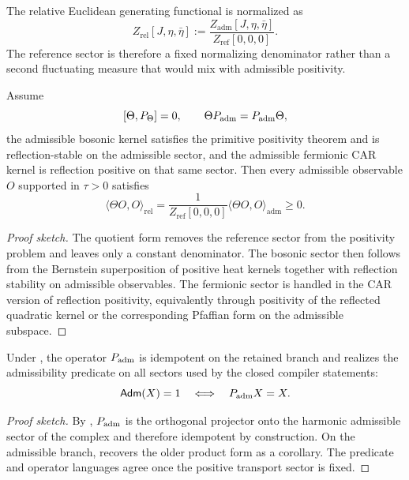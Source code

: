 \begin{definition}
\label{def:relative-generating-functional}
The relative Euclidean generating functional is normalized as
\[
Z_{\mathrm{rel}}[J,\eta,\bar\eta]
:=
\frac{Z_{\mathrm{adm}}[J,\eta,\bar\eta]}{Z_{\mathrm{ref}}[0,0,0]}.
\]
The reference sector is therefore a fixed normalizing denominator rather than a second fluctuating measure that would mix with admissible positivity.
\end{definition}

\begin{lemma}
\label{lem:admissible-reflection-positivity}
Assume
\[
[\Theta,P_\Theta]=0,
\qquad
\Theta P_{\mathrm{adm}}=P_{\mathrm{adm}}\Theta,
\]
the admissible bosonic kernel satisfies the primitive positivity theorem
 and is reflection-stable on the admissible sector, and the
admissible fermionic CAR kernel is reflection positive on that same sector. Then every
admissible observable $O$ supported in $\tau>0$ satisfies
\[
\langle \Theta O,O\rangle_{\mathrm{rel}}
=
\frac{1}{Z_{\mathrm{ref}}[0,0,0]}
\langle \Theta O,O\rangle_{\mathrm{adm}}
\ge 0.
\]
\end{lemma}

\begin{proof}[Proof sketch]
The quotient form  removes the reference sector from the positivity problem and leaves only a constant denominator. The bosonic sector then follows from the Bernstein superposition of positive heat kernels together with reflection stability on admissible observables. The fermionic sector is handled in the CAR version of reflection positivity, equivalently through positivity of the reflected quadratic kernel or the corresponding Pfaffian form on the admissible subspace.
\end{proof}

\begin{theorem}
Under , the operator $P_{\mathrm{adm}}$ is idempotent on the retained branch and realizes the admissibility predicate on all sectors used by the closed compiler statements:
\[
\mathsf{Adm}(X)=1
\quad\Longleftrightarrow\quad
P_{\mathrm{adm}} X = X.
\]
\end{theorem}

\begin{proof}[Proof sketch]
By , $P_{\mathrm{adm}}$ is the orthogonal projector onto the
harmonic admissible sector of the complex and therefore idempotent by construction. On the
admissible branch,  recovers the older product form
as a corollary. The predicate and operator languages agree once the positive transport sector is
fixed.
\end{proof}

